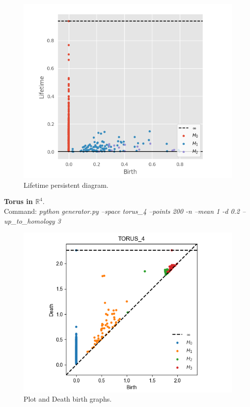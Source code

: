 \documentclass[11pt,a4paper]{report}
\begin{document}
              \begin{figure}[H]
                \centering
                \includegraphics[width=0.5\linewidth, scale=0.5]{./ripser/pro_plane4_lifetime.png}
                \caption{Lifetime persistent diagram.}
                \label{fig:sep hom}
              \end{figure}

              \textbf{Torus in $\mathbb{R}^4$}.\\
              Command: \textit{python generator.py --space torus\_4 --points 200 -n --mean 1 -d 0.2 --up\_to\_homology 3}

              \begin{figure}[H]
                \centering
                \includegraphics[width=\linewidth]{./ripser/on_torus4.png}
                \caption{Plot and Death birth graphs.}
                \label{fig:sep hom}
              \end{figure}
\end{document}
